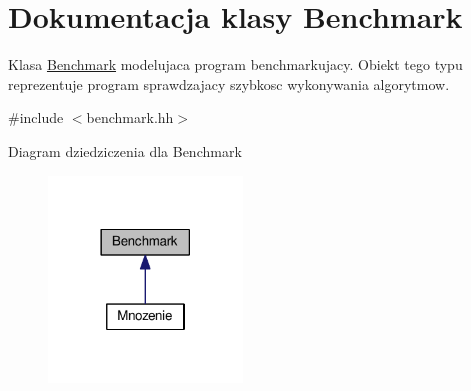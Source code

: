 \hypertarget{class_benchmark}{\section{Dokumentacja klasy Benchmark}
\label{class_benchmark}
}


Klasa \hyperlink{class_benchmark}{Benchmark} modelujaca program benchmarkujacy. Obiekt tego typu reprezentuje program sprawdzajacy szybkosc wykonywania algorytmow.  




{\ttfamily \#include $<$benchmark.\-hh$>$}



Diagram dziedziczenia dla Benchmark\nopagebreak
\begin{figure}[H]
\begin{center}
\leavevmode
\includegraphics[width=146pt]{class_benchmark__inherit__graph}
\end{center}
\end{figure}
